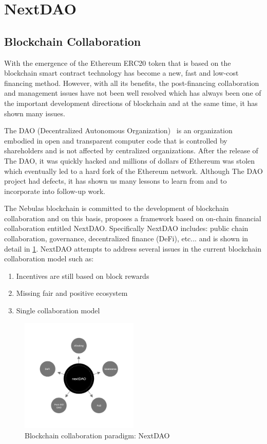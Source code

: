 \section{NextDAO}
\subsection{Blockchain Collaboration}
With the emergence of the Ethereum ERC20 token that is based on the blockchain smart contract technology has become a new, fast and low-cost financing method. However, with all its benefits, the post-financing collaboration and management issues have not been well resolved which has always been one of the important development directions of blockchain and at the same time, it has shown many issues.

The DAO (Decentralized Autonomous Organization)~\cite{DAO} is an organization embodied in open and transparent computer code that is controlled by shareholders and is not affected by centralized organizations. After the release of The DAO, it was quickly hacked and millions of dollars of Ethereum was stolen which eventually led to a hard fork of the Ethereum network. Although The DAO project had defects, it has shown us many lessons to learn from and to incorporate into  follow-up work.

The Nebulas blockchain is committed to the development of blockchain collaboration and on this basis, proposes a framework based on on-chain financial collaboration entitled NextDAO. Specifically NextDAO includes: public chain collaboration, governance, decentralized finance (DeFi), etc... and is shown in detail in \ref{fig:nextdao}. NextDAO attempts to address several issues in the current blockchain collaboration model such as:

\begin{enumerate}[\hspace{1cm}(a)] 
  \item Incentives are still based on block rewards 
  \item Missing fair and positive ecosystem 
  \item Single collaboration model
\end{enumerate} 

\begin{figure}[htbp] 
  \centering 
  \includegraphics[width=0.5\textwidth]{../common/nextdao.pdf}
  \caption{Blockchain collaboration paradigm: NextDAO \label{fig:nextdao}} 
\end{figure} 

